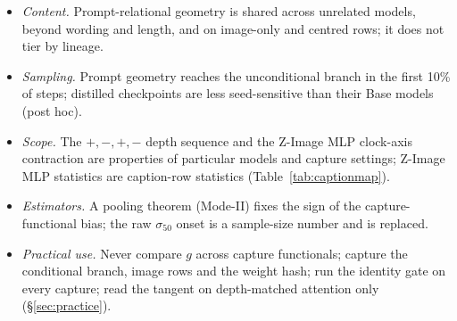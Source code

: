\documentclass[11pt]{article}
\begin{document}
\begin{center}
{\begin{minipage}{0.94\linewidth}
\begin{itemize}
 \item \emph{Content.} Prompt-relational geometry is shared across unrelated models, beyond wording and length, and on image-only and centred rows; it does not tier by lineage.
 \item \emph{Sampling.} Prompt geometry reaches the unconditional branch in the first 10\% of steps; distilled checkpoints are less seed-sensitive than their Base models (post hoc).
 \item \emph{Scope.} The $+,-,+,-$ depth sequence and the Z-Image MLP clock-axis contraction are properties of particular models and capture settings; Z-Image MLP statistics are caption-row statistics (Table~\ref{tab:captionmap}).
 \item \emph{Estimators.} A pooling theorem (Mode-II) fixes the sign of the capture-functional bias; the raw $\sigma_{50}$ onset is a sample-size number and is replaced.
 \item \emph{Practical use.} Never compare $g$ across capture functionals; capture the conditional branch, image rows and the weight hash; run the identity gate on every capture; read the tangent on depth-matched attention only (\S\ref{sec:practice}).
\end{itemize}
\end{minipage}}
\end{center}
\end{document}
